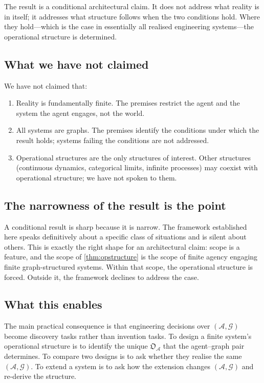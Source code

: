 \documentclass[11pt,a4paper]{article}
\theoremstyle{thmstyle}
\theoremstyle{definition}
\theoremstyle{remark}
\newcommand{\Graph}{\mathcal{G}}
\newcommand{\Agent}{\mathcal{A}}
\newcommand{\OpStr}{\mathfrak{O}}
\begin{document}
The result is a conditional architectural claim. It does not
address what reality is in itself; it addresses what structure
follows when the two conditions hold. Where they hold---which is
the case in essentially all realised engineering systems---the
operational structure is determined.

\subsection{What we have not claimed}

We have not claimed that:
\begin{enumerate}[nosep,leftmargin=*]
\item Reality is fundamentally finite. The premises restrict the
agent and the system the agent engages, not the world.
\item All systems are graphs. The premises identify the conditions
under which the result holds; systems failing the conditions are
not addressed.
\item Operational structures are the only structures of interest.
Other structures (continuous dynamics, categorical limits, infinite
processes) may coexist with operational structure; we have not
spoken to them.
\end{enumerate}

\subsection{The narrowness of the result is the point}

A conditional result is sharp because it is narrow. The framework
established here speaks definitively about a specific class of
situations and is silent about others. This is exactly the right
shape for an architectural claim: scope is a feature, and the scope
of \cref{thm:opstructure} is the scope of finite agency engaging
finite graph-structured systems. Within that scope, the operational
structure is forced. Outside it, the framework declines to address
the case.

\subsection{What this enables}

The main practical consequence is that engineering decisions over
$(\Agent, \Graph)$ become discovery tasks rather than invention
tasks. To design a finite system's operational structure is to
identify the unique $\OpStr_\Agent$ that the agent--graph pair
determines. To compare two designs is to ask whether they realise
the same $(\Agent, \Graph)$. To extend a system is to ask how the
extension changes $(\Agent, \Graph)$ and re-derive the structure.
\end{document}
